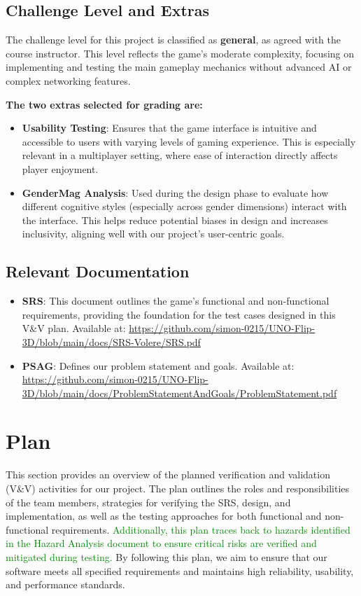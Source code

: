 \documentclass[12pt]{article}
\newcommand{\added}[1]{\textcolor{green}{#1}}
\begin{document}
\subsection{Challenge Level and Extras}
The challenge level for this project is classified as \textbf{general}, as agreed with the course instructor. This level reflects the game’s moderate complexity, focusing on implementing and testing the main gameplay mechanics without advanced AI or complex networking features.

\textbf{The two extras selected for grading are:}
\begin{itemize}
    \item \textbf{Usability Testing}: Ensures that the game interface is intuitive and accessible to users with varying levels of gaming experience. This is especially relevant in a multiplayer setting, where ease of interaction directly affects player enjoyment.
    \item \textbf{GenderMag Analysis}: Used during the design phase to evaluate how different cognitive styles (especially across gender dimensions) interact with the interface. This helps reduce potential biases in design and increases inclusivity, aligning well with our project's user-centric goals.
\end{itemize}

\subsection{Relevant Documentation}
\begin{itemize}
    \item \textbf{SRS}: This document outlines the game's functional and non-functional requirements, providing the foundation for the test cases designed in this V\&V plan. Available at: \url{https://github.com/simon-0215/UNO-Flip-3D/blob/main/docs/SRS-Volere/SRS.pdf}
    \item \textbf{PSAG}: Defines our problem statement and goals. Available at: \url{https://github.com/simon-0215/UNO-Flip-3D/blob/main/docs/ProblemStatementAndGoals/ProblemStatement.pdf}
\end{itemize}

\section{Plan}
This section provides an overview of the planned verification and validation (V\&V) activities for our project. The plan outlines the roles and responsibilities of the team members, strategies for verifying the SRS, design, and implementation, as well as the testing approaches for both functional and non-functional requirements. \added{Additionally, this plan traces back to hazards identified in the Hazard Analysis document to ensure critical risks are verified and mitigated during testing.} By following this plan, we aim to ensure that our software meets all specified requirements and maintains high reliability, usability, and performance standards.
\end{document}
